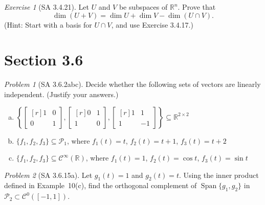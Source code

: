 \documentclass[fleqn,11pt]{paper}
\theoremstyle{remark}
\newtheorem{problem}{Problem}
\newtheorem*{exercise}{Exercise}
\newtheorem*{solution}{{\bf Solution}}
\newcommand\R{\fld{R}}
\renewcommand{\dim}{\ensuremath{\operatorname{dim}}}
\newcommand{\<}{\ensuremath{\langle}}
\renewcommand{\>}{\ensuremath{\rangle}}
\newcommand\fld[1]{\ensuremath{\mathbb{#1}}}
\newcommand\Span{\ensuremath{\operatorname{Span}}}
\begin{document}
\vfill

\begin{exercise}[SA 3.4.21] 
Let $U$ and $V$ be subspaces of $\R^n$. 
Prove that 
\[
\dim(U + V) = \dim U + \dim V - \dim(U \cap V).
\] 
(Hint: Start with a basis for $U \cap V$, and use Exercise 3.4.17.)
\end{exercise}
\vskip8cm

\newpage

\section*{Section 3.6}

\begin{problem}[SA 3.6.2abc]
Decide whether the following sets of vectors are linearly independent. 
(Justify your answers.)
\begin{enumerate}[a.]
\item
  $\left\{\begin{bmatrix*}[r]1&0\\0&1\end{bmatrix*},
          \begin{bmatrix*}[r]0&1\\1&0\end{bmatrix*},
          \begin{bmatrix*}[r]1&1\\1&-1\end{bmatrix*}\right\} \subseteq \R^{2\times 2}$
\item
  $\{f_1, f_2, f_3\} \subseteq \mathcal{P}_1$, where
  $f_1(t) = t$, $f_2(t) = t + 1$, $f_3(t) = t + 2$
\item
  $\{f_1, f_2, f_3\} \subseteq \mathcal{C}^\infty(\R)$, where
  $f_1(t) = 1$, $f_2(t) = \cos t$, $f_3(t) = \sin t$
\end{enumerate}
\end{problem}

\newpage

\begin{problem}[SA 3.6.15a]
Let $g_1(t) = 1$ and $g_2(t) = t$. 
Using the inner product defined in Example~10(c), find
the orthogonal complement of $\Span \{g_1, g_2\}$ in
$\mathcal{P}_2 \subset \mathcal{C}^0([-1, 1])$.
\end{problem}
\end{document}
